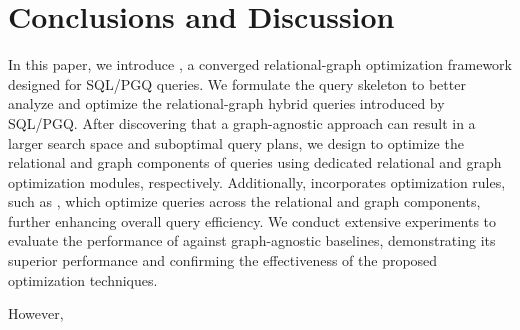 
\section{Conclusions and Discussion}
\label{sec:conclusions}

In this paper, we introduce \name, a converged relational-graph optimization framework designed for SQL/PGQ queries. We formulate the \spjm query skeleton to better analyze and optimize the relational-graph hybrid queries introduced by SQL/PGQ. After discovering that a graph-agnostic approach can result in a larger search space and suboptimal query plans, we design \name to optimize the relational and graph components of \spjm queries using dedicated relational and graph optimization modules, respectively. Additionally, \name incorporates optimization rules, such as \filterrule, which optimize queries across the relational and graph components, further enhancing overall query efficiency. We conduct extensive experiments to evaluate the performance of \name against graph-agnostic baselines, demonstrating its superior performance and confirming the effectiveness of the proposed optimization techniques. 


However, 

